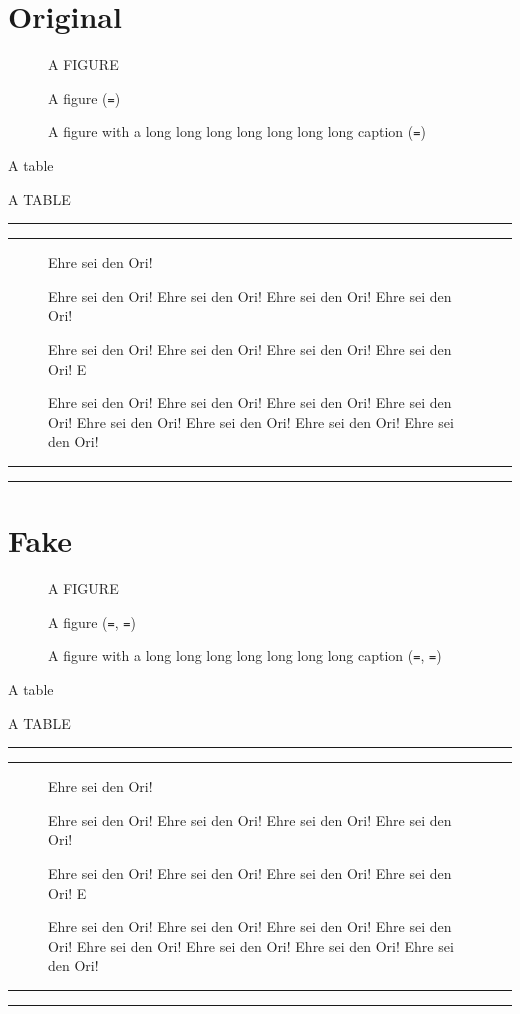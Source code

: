 \documentclass{smfart}
\begin{document}
\section{Original}
\OriginalCaptions
\setcounter{figure}{0}
\setcounter{table}{0}

\begin{figure}[!ht]
\centering A FIGURE
\caption{A figure (\texttt{\string\captionindent=\the\captionindent})}
\caption{A figure with a long long long long long long long caption
         (\texttt{\string\captionindent=\the\captionindent})}
\end{figure}

\begin{table}[!ht]
\caption{A table}
\centering A TABLE
\end{table}

\hrule
\noindent\rule{\captionindent}{1pt}%

\begin{figure}[!ht]
\centering Ehre sei den Ori!
\caption{Ehre sei den Ori! Ehre sei den Ori! Ehre sei den Ori! Ehre sei den Ori!}
\caption{Ehre sei den Ori! Ehre sei den Ori! Ehre sei den Ori! Ehre sei den Ori! E}
\caption{Ehre sei den Ori! Ehre sei den Ori! Ehre sei den Ori! Ehre sei den Ori!
         Ehre sei den Ori! Ehre sei den Ori! Ehre sei den Ori! Ehre sei den Ori!}
\end{figure}

\noindent\rule{\captionindent}{1pt}%
\hrule

\clearpage
\section{Fake}
\FakeCaptions
\setcounter{figure}{0}
\setcounter{table}{0}

\makeatletter
\let\captionmarginx\captionmargin@
\makeatother

\begin{figure}[!ht]
\centering A FIGURE
\caption{A figure
         (\texttt{\string\captionmargin=\the\captionmargin},
          \texttt{\string\captionmargin@=\the\captionmarginx})}
\caption{A figure with a long long long long long long long caption
         (\texttt{\string\captionmargin=\the\captionmargin},
          \texttt{\string\captionmargin@=\the\captionmarginx})}
\end{figure}

\begin{table}[!ht]
\caption{A table}
\centering A TABLE
\end{table}

\hrule
\noindent\rule{\captionindent}{1pt}%

\begin{figure}[!ht]
\centering Ehre sei den Ori!
\caption{Ehre sei den Ori! Ehre sei den Ori! Ehre sei den Ori! Ehre sei den Ori!}
\caption{Ehre sei den Ori! Ehre sei den Ori! Ehre sei den Ori! Ehre sei den Ori! E}
\caption{Ehre sei den Ori! Ehre sei den Ori! Ehre sei den Ori! Ehre sei den Ori!
         Ehre sei den Ori! Ehre sei den Ori! Ehre sei den Ori! Ehre sei den Ori!}
\end{figure}

\noindent\rule{\captionindent}{1pt}%
\hrule

\vfill
\end{document}
